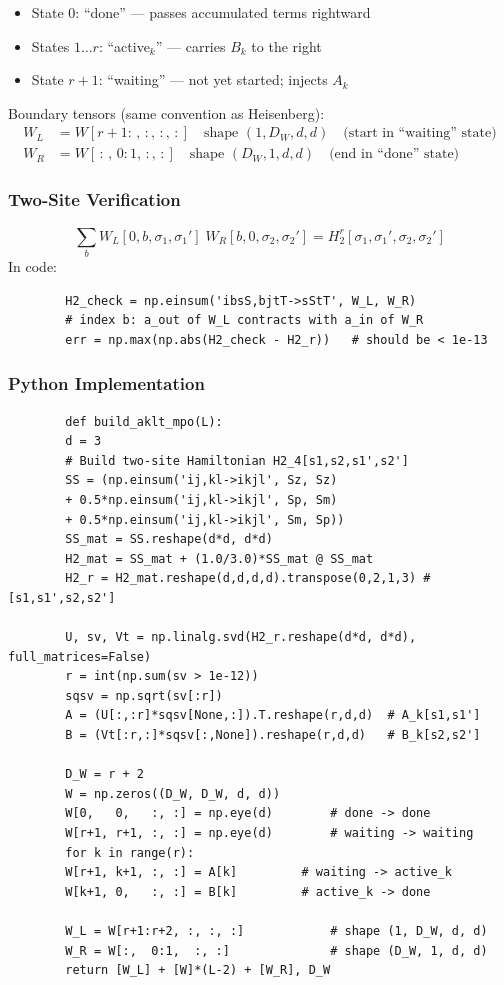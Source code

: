 \documentclass[aps,prb,onecolumn,scriptaddress]{revtex4-2}
\begin{document}
	\begin{itemize}
		\item State $0$: ``done'' — passes accumulated terms rightward
		\item States $1\ldots r$: ``active$_k$'' — carries $B_k$ to the right
		\item State $r+1$: ``waiting'' — not yet started; injects $A_k$
	\end{itemize}
	
	Boundary tensors (same convention as Heisenberg):
	\begin{align}
		W_L &= W[r+1:\,,\, :,\, :,\, :] \quad \text{shape }(1, D_W, d, d)
		\quad\text{(start in ``waiting'' state)}\\
		W_R &= W[\,:\,,\, 0:1,\, :,\, :] \quad \text{shape }(D_W, 1, d, d)
		\quad\text{(end in ``done'' state)}
	\end{align}
	
	\subsubsection{Two-Site Verification}
	
	\begin{equation}
		\sum_b W_L[0, b, \sigma_1, \sigma_1']\; W_R[b, 0, \sigma_2, \sigma_2']
		= H_2^r[\sigma_1,\sigma_1',\sigma_2,\sigma_2']
	\end{equation}
	In code:
	\begin{verbatim}
		H2_check = np.einsum('ibsS,bjtT->sStT', W_L, W_R)
		# index b: a_out of W_L contracts with a_in of W_R
		err = np.max(np.abs(H2_check - H2_r))   # should be < 1e-13
	\end{verbatim}
	
	\subsubsection{Python Implementation}
	
	\begin{verbatim}
		def build_aklt_mpo(L):
		d = 3
		# Build two-site Hamiltonian H2_4[s1,s2,s1',s2']
		SS = (np.einsum('ij,kl->ikjl', Sz, Sz)
		+ 0.5*np.einsum('ij,kl->ikjl', Sp, Sm)
		+ 0.5*np.einsum('ij,kl->ikjl', Sm, Sp))
		SS_mat = SS.reshape(d*d, d*d)
		H2_mat = SS_mat + (1.0/3.0)*SS_mat @ SS_mat
		H2_r = H2_mat.reshape(d,d,d,d).transpose(0,2,1,3) # [s1,s1',s2,s2']
		
		U, sv, Vt = np.linalg.svd(H2_r.reshape(d*d, d*d), full_matrices=False)
		r = int(np.sum(sv > 1e-12))
		sqsv = np.sqrt(sv[:r])
		A = (U[:,:r]*sqsv[None,:]).T.reshape(r,d,d)  # A_k[s1,s1']
		B = (Vt[:r,:]*sqsv[:,None]).reshape(r,d,d)   # B_k[s2,s2']
		
		D_W = r + 2
		W = np.zeros((D_W, D_W, d, d))
		W[0,   0,   :, :] = np.eye(d)        # done -> done
		W[r+1, r+1, :, :] = np.eye(d)        # waiting -> waiting
		for k in range(r):
		W[r+1, k+1, :, :] = A[k]         # waiting -> active_k
		W[k+1, 0,   :, :] = B[k]         # active_k -> done
		
		W_L = W[r+1:r+2, :, :, :]            # shape (1, D_W, d, d)
		W_R = W[:,  0:1,  :, :]              # shape (D_W, 1, d, d)
		return [W_L] + [W]*(L-2) + [W_R], D_W
	\end{verbatim}
	
\end{document}
